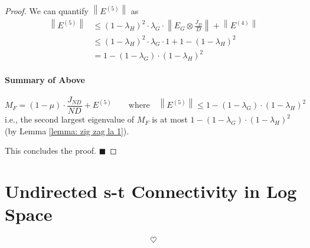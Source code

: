 \documentclass[11pt, letter]{book}
\newcommand{\qed}{\hfill $\blacksquare$}
\newcommand{\norm}[1]{\left\lVert#1\right\rVert}
\begin{document}
\begin{proof}
	We can quantify $\norm{E^{(5)}}$ as 
	\begin{align}
		\norm{E^{(5)}}
		& \leq ( 1- \lambda_H)^2 \cdot \lambda_G \cdot \norm{E_G \otimes \frac{J_D}{D}} + \norm{ E^{(4)}} \\
		& \leq ( 1- \lambda_H)^2 \cdot \lambda_G \cdot 1 + 1 - (1 - \lambda_H) ^2 \\
		& = {1 - (1 - \lambda_G) \cdot (1 - \lambda_H) ^ 2}
	\end{align}
	
	\begin{mdframed}
		\paragraph{Summary of Above}
		\begin{equation}
			M_F = (1 - \mu) \cdot \frac{J_{ND}}{ND} + E^{(5)} \quad\quad \text{where} \quad \norm{E^{(5)}} \leq 1 - (1 - \lambda_G) \cdot (1 - \lambda_H) ^ 2
		\end{equation}
		i.e., the second largest eigenvalue of $M_F$ is at most $1 - (1 - \lambda_G) \cdot (1 - \lambda_H) ^ 2$ (by Lemma \ref{lemma: zig zag la 1}). 
	\end{mdframed}
	
	This concludes the proof. \qed
\end{proof}


\section{Undirected s-t Connectivity in Log Space}
































\vfill 
\begin{equation*}
	\heartsuit
\end{equation*}
\end{document}
